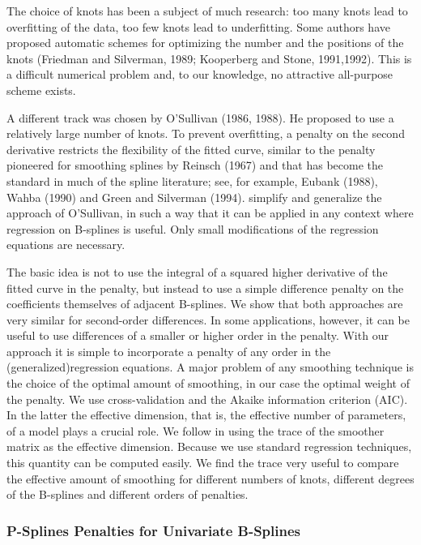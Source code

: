 \documentclass[12pt]{article}
\newcommand*\needsparaphrased{\color{red}}
\newcommand*\outlineskeleton{\color{green}}
\begin{document}
{ \needsparaphrased The choice of knots has been a subject of much research: too many knots lead to overfitting of the data, too few knots lead to underfitting. Some authors have proposed automatic schemes for optimizing the number and the positions of the knots (Friedman and Silverman, 1989; Kooperberg and Stone, 1991,1992). This is a difficult numerical problem and, to our knowledge, no attractive all-purpose scheme exists.}

{ \needsparaphrased A different track was chosen by O'Sullivan (1986, 1988). He proposed to use a relatively large number of knots. To prevent overfitting, a penalty on the second derivative restricts the flexibility of the fitted curve, similar to the penalty pioneered for smoothing splines by Reinsch (1967) and that has become the standard in much of the spline literature; see, for example, Eubank (1988), Wahba (1990) and Green and Silverman (1994). \cite{eilers1996flexible} simplify and generalize the approach of O'Sullivan, in such a way that it can be applied in any context where regression on B-splines is useful. Only small modifications of the regression equations are necessary.

The basic idea is not to use the integral of a squared higher derivative of the fitted curve in the penalty, but instead to use a simple difference penalty on the coefficients themselves of adjacent B-splines. We show that both approaches are very similar for second-order differences. In some applications, however, it can be useful to use differences of a smaller or higher order in the penalty. With our approach it is simple to incorporate a penalty of any order in the (generalized)regression equations. A major problem of any smoothing technique is the choice of the optimal amount of smoothing, in our case the optimal weight of the penalty. We use cross-validation and the Akaike information criterion (AIC). In the latter the effective dimension, that is, the effective number of parameters, of a model plays a crucial role. We follow \cite{buja1989linear} in using the trace of the smoother matrix as the effective dimension. Because we use standard regression techniques, this quantity can be computed easily. We find the trace very useful to compare the effective amount of smoothing for different numbers of knots, different degrees of the B-splines and different orders of penalties.}

\subsubsection{{\outlineskeleton P-Splines Penalties for Univariate B-Splines}}
\end{document}

